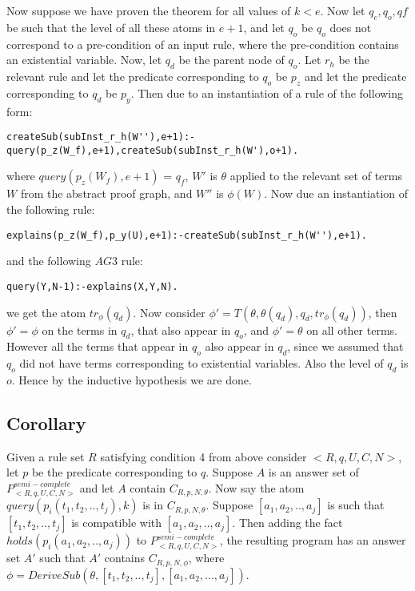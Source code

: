\documentclass[sigconf]{acmart}
\begin{document}
Now suppose we have proven the theorem for all values of $k<e$. Now let $q_{c},q_{o},q{f}$ be such that the level of all these atoms in $e+1$, and let $q_{o}$ be $q_{o}$ does not correspond to a pre-condition of an input rule, where the pre-condition contains an existential variable. Now, let $q_{d}$ be the parent node of $q_{o}$. Let $r_{h}$ be the relevant rule and let the predicate corresponding to $q_{o}$ be $p_{z}$ and let the predicate corresponding to $q_{d}$ be $p_{y}$. Then due to an instantiation of a rule of the following form:
\begin{verbatim}
createSub(subInst_r_h(W''),e+1):-query(p_z(W_f),e+1),createSub(subInst_r_h(W'),o+1).
\end{verbatim}
where $query(p_{z}(W_{f}),e+1)$ = $q_{f}$, $W'$ is $\theta$ applied to the relevant set of terms $W$ from the abstract proof graph, and $W''$ is $\phi(W)$. Now due an instantiation of the following rule:
\begin{verbatim}
explains(p_z(W_f),p_y(U),e+1):-createSub(subInst_r_h(W''),e+1).
\end{verbatim} and the following $AG3$ rule:
\begin{verbatim}
query(Y,N-1):-explains(X,Y,N).    
\end{verbatim}
we get the atom $tr_{\phi}(q_{d})$. Now consider $\phi'= T(\theta, \theta(q_{d}), q_{d}, tr_{\phi}(q_{d}))$, then $\phi'=\phi$ on the terms in $q_{d}$, that also appear in $q_{o}$, and $\phi' = \theta$ on all other terms. However all the terms that appear in $q_{o}$ also appear in $q_{d}$, since we assumed that $q_{o}$ did not have terms corresponding to existential variables. Also the level of $q_{d}$ is $o$. Hence by the inductive hypothesis we are done.




 
\subsection{Corollary}
Given a rule set $R$ satisfying condition 4 from above consider $<R,q,U,C,N>$, let $p$ be the predicate corresponding to $q$. Suppose $A$ is an answer set of $P^{semi-complete}_{<R,q,U,C,N>}$ and let $A$ contain $C_{R,p,N,\theta}$. Now say the atom $query(p_{i}(t_{1},t_{2},..,t_{j}),k)$ is in $C_{R,p,N,\theta}$. Suppose $[a_{1},a_{2},..,a_{j}]$ is such that $[t_{1},t_{2},..,t_{j}]$ is compatible with $[a_{1},a_{2},..,a_{j}]$. Then adding the fact $holds(p_{i}(a_{1},a_{2},..,a_{j}))$ to $P^{semi-complete}_{<R,q,U,C,N>}$, the resulting program has an answer set $A'$ such that $A'$ contains $C_{R,p,N,\phi}$, where $\phi = DeriveSub(\theta, [t_{1},t_{2},..,t_{j}],[a_{1},a_{2},...,a_{j}])$. 
\end{document}
